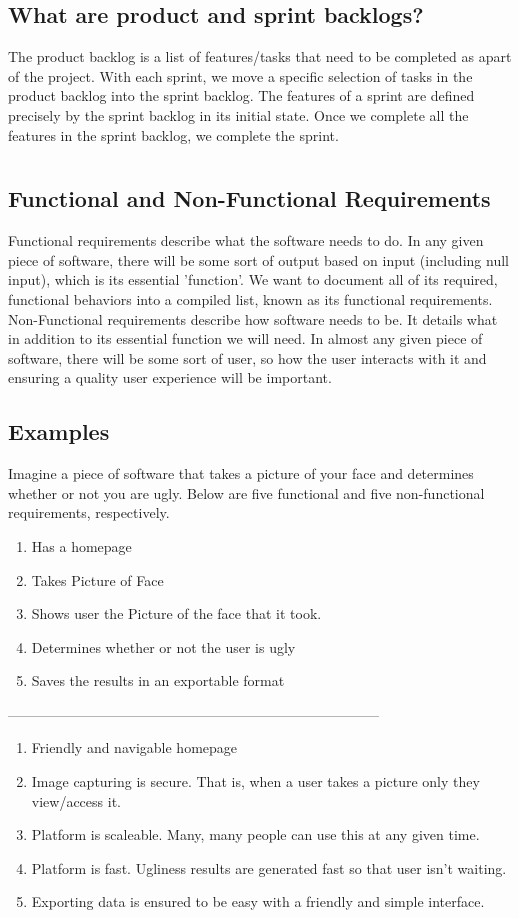\documentclass{article}
\begin{document}
\subsection{What are product and sprint backlogs?}
The product backlog is a list of features/tasks that need to be completed as apart of the project.  With each sprint, we move a specific selection of tasks in the product backlog into the sprint backlog.  The features of a sprint are defined precisely by the sprint backlog in its initial state.  Once we complete all the features in the sprint backlog, we complete the sprint.
\section{}
\subsection{Functional and Non-Functional Requirements}
Functional requirements describe what the software needs to do.  In any given piece of software, there will be some sort of output based on input (including null input), which is its essential 'function'. We want to document all of its required, functional behaviors into a compiled list, known as its functional requirements.  Non-Functional requirements describe how software needs to be.  It details what in addition to its essential function we will need.  In almost any given piece of software, there will be some sort of user, so how the user interacts with it and ensuring a quality user experience will be important.  

\subsection{Examples}
Imagine a piece of software that takes a picture of your face and determines whether or not you are ugly.  Below are five functional and five non-functional requirements, respectively.  
\begin{enumerate}
    \item Has a homepage
    \item Takes Picture of Face
    \item Shows user the Picture of the face that it took.
    \item Determines whether or not the user is ugly
    \item Saves the results in an exportable format
\end{enumerate} 
--------------------------------------------------------------------------------
\begin{enumerate}
    \item Friendly and navigable homepage
    \item Image capturing is secure.  That is, when a user takes a picture only they view/access it.
    \item Platform is scaleable.  Many, many people can use this at any given time.
    \item Platform is fast.  Ugliness results are generated fast so that user isn't waiting.
    \item Exporting data is ensured to be easy with a friendly and simple interface.
\end{enumerate}
\end{document}
